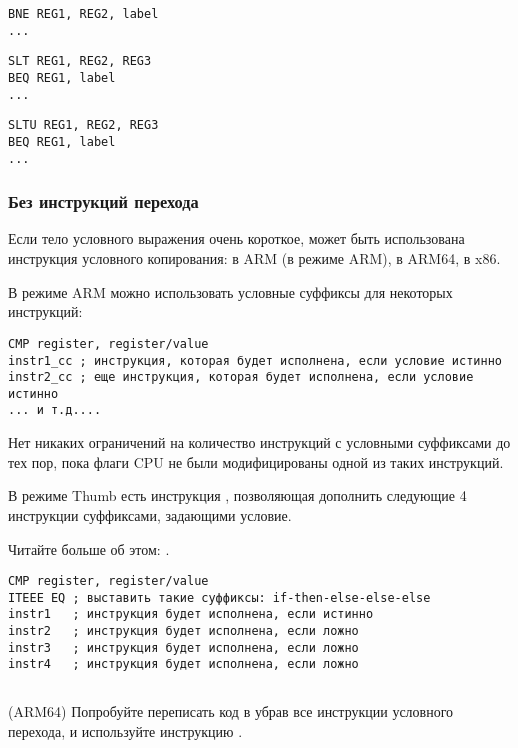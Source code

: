 \begin{lstlisting}[caption=Проверка на неравенство]
BNE REG1, REG2, label
...
\end{lstlisting}

\begin{lstlisting}[caption=Проверка на меньше{,} больше (знаковое)]
SLT REG1, REG2, REG3
BEQ REG1, label
...
\end{lstlisting}

\begin{lstlisting}[caption=Проверка на меньше{,} больше (беззнаковое)]
SLTU REG1, REG2, REG3
BEQ REG1, label
...
\end{lstlisting}

\subsubsection{Без инструкций перехода}


Если тело условного выражения очень короткое, может быть
использована инструкция условного копирования:  в ARM (в режиме ARM),  в ARM64,  в x86.


В режиме ARM можно использовать условные суффиксы для некоторых инструкций:

\begin{lstlisting}[caption=ARM (\ARMMode)]
CMP register, register/value
instr1_cc ; инструкция, которая будет исполнена, если условие истинно
instr2_cc ; еще инструкция, которая будет исполнена, если условие истинно
... и т.д....
\end{lstlisting}

Нет никаких ограничений на количество инструкций с условными суффиксами до тех пор,
пока флаги CPU не были модифицированы одной из таких инструкций.


В режиме Thumb есть инструкция , позволяющая дополнить следующие 4 инструкции суффиксами, задающими
условие.

Читайте больше об этом: .

\begin{lstlisting}[caption=ARM (\ThumbMode)]
CMP register, register/value
ITEEE EQ ; выставить такие суффиксы: if-then-else-else-else
instr1   ; инструкция будет исполнена, если истинно
instr2   ; инструкция будет исполнена, если ложно
instr3   ; инструкция будет исполнена, если ложно
instr4   ; инструкция будет исполнена, если ложно
\end{lstlisting}

\subsection{\Exercise}

(ARM64) Попробуйте переписать код в  
убрав все инструкции условного перехода, и используйте инструкцию .

